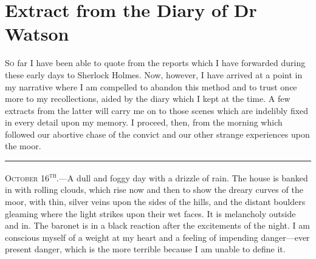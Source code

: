 \chapter{Extract from the Diary of Dr Watson}
\lettrine[lines=4]{S}{o} far I have been able to quote from the reports which I have forwarded during these early days to Sherlock Holmes. Now, however, I have arrived at a point in my narrative where I am compelled to abandon this method and to trust once more to my recollections, aided by the diary which I kept at the time. A few extracts from the latter will carry me on to those scenes which are indelibly fixed in every detail upon my memory. I proceed, then, from the morning which followed our abortive chase of the convict and our other strange experiences upon the moor.
\vfill

\noindent\hfil\rule{0.5\textwidth}{.4pt}\hfil 

\textsc{October 16\textsuperscript{th}.}—A dull and foggy day with a drizzle of rain. The house is banked in with rolling clouds, which rise now and then to show the dreary curves of the moor, with thin, silver veins upon the sides of the hills, and the distant boulders gleaming where the light strikes upon their wet faces. It is melancholy outside and in. The baronet is in a black reaction after the excitements of the night. I am conscious myself of a weight at my heart and a feeling of impending danger—ever present danger, which is the more terrible because I am unable to define it.

